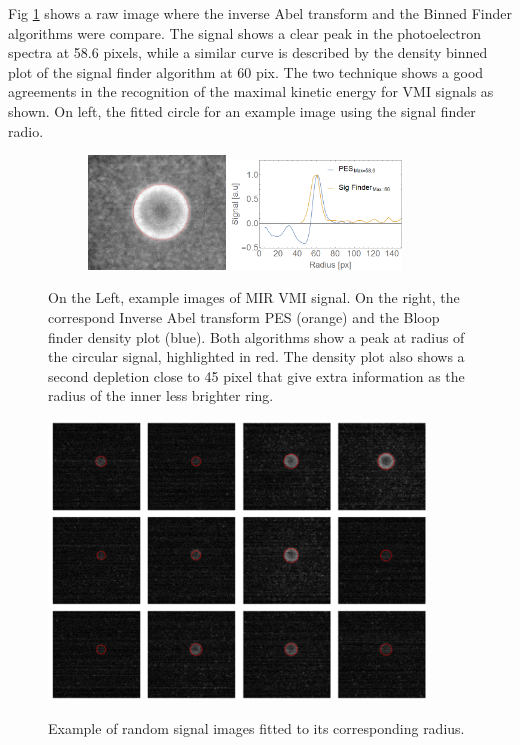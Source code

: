 Fig \ref{fig:abelfinder} shows a raw image where the inverse Abel transform and the Binned Finder algorithms were compare. The signal shows a clear peak in the photoelectron spectra at 58.6 pixels, while a similar curve is described by the density binned plot of the signal finder algorithm at 60 pix. The two technique shows a good agreements in the recognition of the maximal kinetic energy for VMI signals as shown. On left, the fitted circle for an example image using the signal finder radio. 


\begin{figure}[hbtp!]
\centering
\begin{subfigure}[l]{1\textwidth}
\includegraphics[width=0.4\textwidth]{../Images/rawVMIfit.PNG} \includegraphics[width=0.5\textwidth]{../Images/pesandFinder.PNG} \end{subfigure} 
\caption[Fit-Abel transform agreement]{On the Left, example images of MIR VMI signal. On the right, the correspond Inverse Abel transform PES (orange) and the Bloop finder density plot (blue). Both algorithms show a peak at radius of the circular signal, highlighted in red. The density plot also shows a second depletion close to 45 pixel that give extra information as the radius of the inner less brighter ring. }
\label{fig:abelfinder}
\end{figure}


\begin{figure}[hbtp]
\caption[Example signal finder]{Example of random signal images fitted to its corresponding radius.}
\centering
\includegraphics[width=10cm]{../Images/density_plot_chekc.png}
\label{fig:checkradius}
\end{figure}

